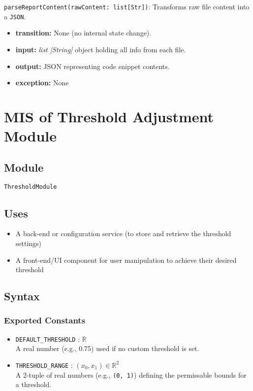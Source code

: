 \documentclass[12pt, titlepage]{article}
\begin{document}
\noindent \texttt{parseReportContent(rawContent: list[Str])}: Transforms raw file content into a \texttt{JSON}.
\begin{itemize}
        \item \textbf{transition:} None (no internal state change).
        \item \textbf{input:}  \textit{list [String]} object holding all info from each
        file.
        \item \textbf{output:} JSON representing code snippet contents.
        \item \textbf{exception:} None
\end{itemize}

\section{MIS of Threshold Adjustment Module} \label{mThreshold} %

\subsection{Module}

\texttt{ThresholdModule}

\subsection{Uses}

\begin{itemize}
    \item A back-end or configuration service (to store and retrieve the threshold settings)
    \item A front-end/UI component for user manipulation to achieve their desired threshold
\end{itemize}

\subsection{Syntax}

\subsubsection{Exported Constants}

\begin{itemize}
    \item \texttt{DEFAULT\_THRESHOLD} :  $\mathbb{R}$ \\
    A real number (e.g., 0.75) used if no custom threshold is set.
    \item \texttt{THRESHOLD\_RANGE} : $(x_0, x_1) \in \mathbb{R}^ 2 $ \\
    A 2-tuple of real numbers  (e.g., \texttt{(0, 1)}) defining the permissable bounds for a threshold.
\end{itemize}
\end{document}
